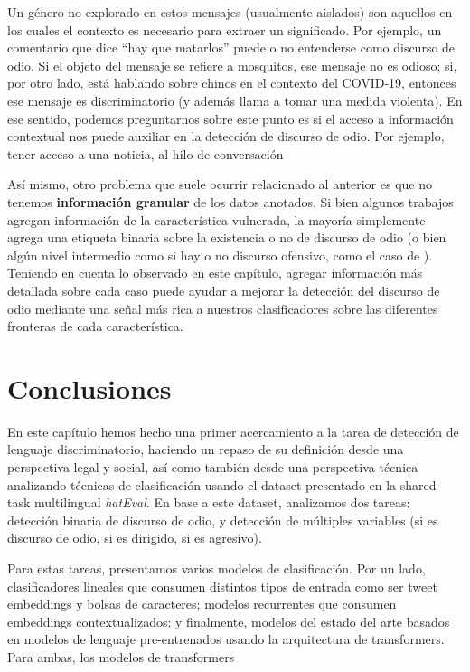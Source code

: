 Un género no explorado en estos mensajes (usualmente aislados) son aquellos en los cuales el contexto es necesario para extraer un significado. Por ejemplo, un comentario que dice ``hay que matarlos'' puede o no entenderse como discurso de odio. Si el objeto del mensaje se refiere a mosquitos, ese mensaje no es odioso; si, por otro lado, está hablando sobre chinos en el contexto del COVID-19, entonces ese mensaje es discriminatorio (y además llama a tomar una medida violenta). En ese sentido, podemos preguntarnos sobre este punto es si el acceso a información contextual nos puede auxiliar en la detección de discurso de odio. Por ejemplo, tener acceso a una noticia, al hilo de conversación

Así mismo, otro problema que suele ocurrir relacionado al anterior es que no tenemos \textbf{información granular} de los datos anotados. Si bien algunos trabajos agregan información de la característica vulnerada, la mayoría simplemente agrega una etiqueta binaria sobre la existencia o no de discurso de odio (o bien algún nivel intermedio como si hay o no discurso ofensivo, como el caso de \citet{Davidson2017AutomatedHS}). Teniendo en cuenta lo observado en este capítulo, agregar información más detallada sobre cada caso puede ayudar a mejorar la detección del discurso de odio mediante una señal más rica a nuestros clasificadores sobre las diferentes fronteras de cada característica.


\section{Conclusiones}

En este capítulo hemos hecho una primer acercamiento a la tarea de detección de lenguaje discriminatorio, haciendo un repaso de su definición desde una perspectiva legal y social, así como también desde una perspectiva técnica analizando técnicas de clasificación usando el dataset presentado en la shared task multilingual \emph{hatEval}\cite{hateval2019semeval}. En base a este dataset, analizamos dos tareas: detección binaria de discurso de odio, y detección de múltiples variables (si es discurso de odio, si es dirigido, si es agresivo).

Para estas tareas, presentamos varios modelos de clasificación. Por un lado, clasificadores lineales que consumen distintos tipos de entrada como ser tweet embeddings y bolsas de caracteres; modelos recurrentes que consumen embeddings contextualizados; y finalmente, modelos del estado del arte basados en modelos de lenguaje pre-entrenados usando la arquitectura de transformers. Para ambas, los modelos de transformers

